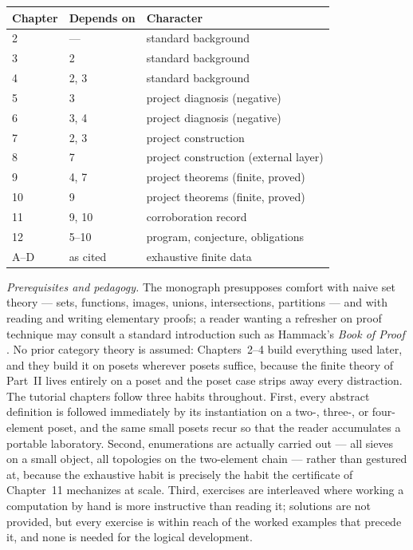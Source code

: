 \begin{center}
\begin{tabular}{lll}
\toprule
Chapter & Depends on & Character \\
\midrule
2 & --- & standard background \\
3 & 2 & standard background \\
4 & 2, 3 & standard background \\
5 & 3 & project diagnosis (negative) \\
6 & 3, 4 & project diagnosis (negative) \\
7 & 2, 3 & project construction \\
8 & 7 & project construction (external layer) \\
9 & 4, 7 & project theorems (finite, proved) \\
10 & 9 & project theorems (finite, proved) \\
11 & 9, 10 & corroboration record \\
12 & 5--10 & program, conjecture, obligations \\
A--D & as cited & exhaustive finite data \\
\bottomrule
\end{tabular}
\end{center}

\emph{Prerequisites and pedagogy.} The monograph presupposes comfort with
naive set theory --- sets, functions, images, unions, intersections,
partitions --- and with reading and writing elementary proofs; a reader
wanting a refresher on proof technique may consult a standard
introduction such as Hammack's \emph{Book of Proof} \cite{bookofproof}. No
prior category theory is assumed: Chapters~2--4 build everything used
later, and they build it on posets wherever posets suffice, because the
finite theory of Part~II lives entirely on a poset and the poset case
strips away every distraction. The tutorial chapters follow three habits
throughout. First, every abstract definition is followed immediately by
its instantiation on a two-, three-, or four-element poset, and the same
small posets recur so that the reader accumulates a portable laboratory.
Second, enumerations are actually carried out --- all sieves on a small
object, all topologies on the two-element chain --- rather than gestured
at, because the exhaustive habit is precisely the habit the certificate of
Chapter~11 mechanizes at scale. Third, exercises are interleaved where
working a computation by hand is more instructive than reading it;
solutions are not provided, but every exercise is within reach of the
worked examples that precede it, and none is needed for the logical
development.

